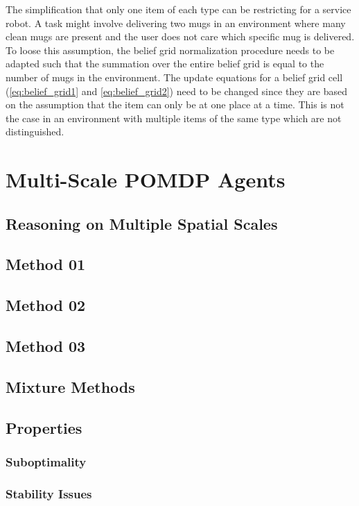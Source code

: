 The simplification that only one item of each type can be restricting for a service robot. A task might involve delivering two mugs in an environment where many clean mugs are present and the user does not care which specific mug is delivered. To loose this assumption, the belief grid normalization procedure needs to be adapted such that the summation over the entire belief grid is equal to the number of mugs in the environment. The update equations for a belief grid cell (\ref{eq:belief_grid1} and \ref{eq:belief_grid2}) need to be changed since they are based on the assumption that the item can only be at one place at a time. This is not the case in an environment with multiple items of the same type which are not distinguished. 
 
\section{Multi-Scale POMDP Agents}\label{sec:MultiScale}
\subsection{Reasoning on Multiple Spatial Scales}
\subsection{Method 01}
\subsection{Method 02}
\subsection{Method 03}
\subsection{Mixture Methods}
\subsection{Properties}
\subsubsection{Suboptimality}
\subsubsection{Stability Issues}

